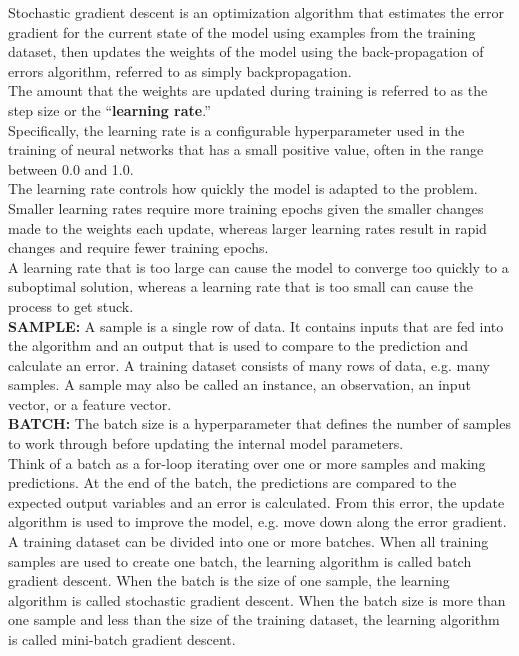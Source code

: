 \begin{tcolorbox}[width=\textwidth,colback={white},title={\textbf{22.} What are the definitions of learning rate, epochs and batches in the context of DNN training? },colbacktitle=red,coltitle=black]

Stochastic gradient descent is an optimization algorithm that estimates the error gradient for the current state of the model using examples from the training dataset, then updates the weights of the model using the back-propagation of errors algorithm, referred to as simply backpropagation.\\

The amount that the weights are updated during training is referred to as the step size or the “\textbf{learning rate}.”\\

Specifically, the learning rate is a configurable hyperparameter used in the training of neural networks that has a small positive value, often in the range between 0.0 and 1.0.\\

The learning rate controls how quickly the model is adapted to the problem. Smaller learning rates require more training epochs given the smaller changes made to the weights each update, whereas larger learning rates result in rapid changes and require fewer training epochs.\\

A learning rate that is too large can cause the model to converge too quickly to a suboptimal solution, whereas a learning rate that is too small can cause the process to get stuck.\\

\textbf{SAMPLE: }A sample is a single row of data. It contains inputs that are fed into the algorithm and an output that is used to compare to the prediction and calculate an error. A training dataset consists of many rows of data, e.g. many samples. A sample may also be called an instance, an observation, an input vector, or a feature vector.\\

\textbf{BATCH: } The batch size is a hyperparameter that defines the number of samples to work through before updating the internal model parameters.\\
Think of a batch as a for-loop iterating over one or more samples and making predictions. At the end of the batch, the predictions are compared to the expected output variables and an error is calculated. From this error, the update algorithm is used to improve the model, e.g. move down along the error gradient.\\
A training dataset can be divided into one or more batches. When all training samples are used to create one batch, the learning algorithm is called batch gradient descent. When the batch is the size of one sample, the learning algorithm is called stochastic gradient descent. When the batch size is more than one sample and less than the size of the training dataset, the learning algorithm is called mini-batch gradient descent.\\


\end{tcolorbox}
